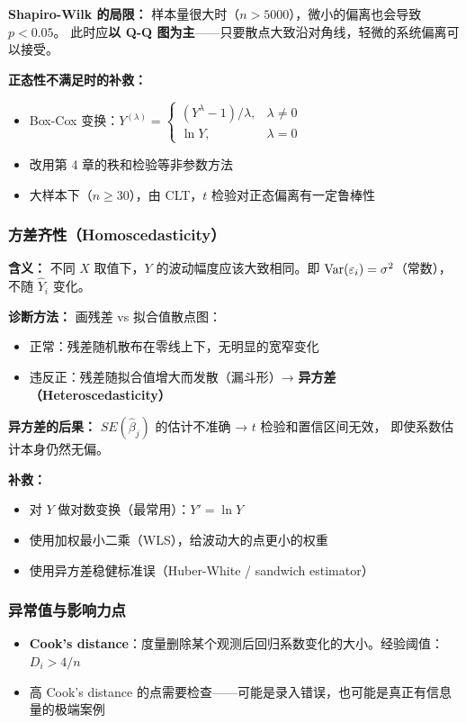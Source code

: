 \textbf{Shapiro-Wilk 的局限：} 样本量很大时（$n > 5000$），微小的偏离也会导致 $p < 0.05$。
此时应\textbf{以 Q-Q 图为主}——只要散点大致沿对角线，轻微的系统偏离可以接受。

\textbf{正态性不满足时的补救：}
\begin{itemize}
    \item Box-Cox 变换：$Y^{(\lambda)} = \begin{cases} (Y^\lambda - 1)/\lambda, & \lambda \neq 0 \\ \ln Y, & \lambda = 0 \end{cases}$
    \item 改用第 4 章的秩和检验等非参数方法
    \item 大样本下（$n \ge 30$），由 CLT，$t$ 检验对正态偏离有一定鲁棒性
\end{itemize}

\subsubsection{方差齐性（Homoscedasticity）}

\textbf{含义：} 不同 $X$ 取值下，$Y$ 的波动幅度应该大致相同。即 $\mathrm{Var}(\varepsilon_i) = \sigma^2$（常数），
不随 $\hat{Y}_i$ 变化。

\textbf{诊断方法：} 画残差 vs 拟合值散点图：
\begin{itemize}
    \item 正常：残差随机散布在零线上下，无明显的宽窄变化
    \item 违反正：残差随拟合值增大而发散（漏斗形）→ \textbf{异方差（Heteroscedasticity）}
\end{itemize}

\textbf{异方差的后果：} $SE(\hat{\beta}_j)$ 的估计不准确 → $t$ 检验和置信区间无效，
即使系数估计本身仍然无偏。

\textbf{补救：}
\begin{itemize}
    \item 对 $Y$ 做对数变换（最常用）：$Y' = \ln Y$
    \item 使用加权最小二乘（WLS），给波动大的点更小的权重
    \item 使用异方差稳健标准误（Huber-White / sandwich estimator）
\end{itemize}

\subsubsection{异常值与影响力点}

\begin{itemize}
    \item \textbf{Cook's distance}：度量删除某个观测后回归系数变化的大小。经验阈值：$D_i > 4/n$
    \item 高 Cook's distance 的点需要检查——可能是录入错误，也可能是真正有信息量的极端案例
\end{itemize}

